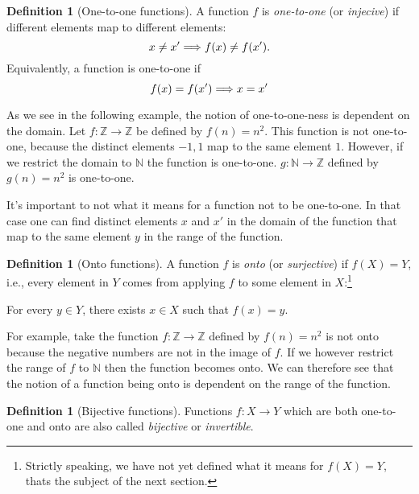 \documentclass[a4paper, twocolumn]{report}
\newcounter{dummy} \numberwithin{dummy}{section}
\theoremstyle{definition}
\newtheorem{defn}[dummy]{Definition}
\theoremstyle{solution}
\begin{document}
\begin{defn}[One-to-one functions]
  \label{defn_3314}
  A function $f$ is \textit{one-to-one} (or \textit{injecive}) if different elements map to different elements:
  \begin{equation}
    \notag
    x \neq x' \Longrightarrow f(x) \neq f(x').
  \end{equation}
  Equivalently, a function is one-to-one if
  \begin{equation}
    \notag
    f(x) = f(x') \Longrightarrow x = x'
  \end{equation}
\end{defn}
\addtocounter{dummy}{2}
As we see in the following example, the notion of one-to-one-ness is dependent
on the domain.  Let $f : \mathbb{Z} \rightarrow \mathbb{Z}$ be defined by $f(n)
= n^{2}$. This function is not one-to-one, because the distinct elements $-1,
1$ map to the same element $1$. However, if we restrict the domain to
$\mathbb{N}$ the function is one-to-one. $g : \mathbb{N} \rightarrow
\mathbb{Z}$ defined by $g(n) = n^{2}$ is one-to-one.

It's important to not what it means for a function not to be one-to-one. In
that case one can find distinct elements $x$ and $x'$ in the domain of the
function that map to the same element $y$ in the range of the function.

\begin{defn}[Onto functions]
  \label{defn_3317}
  A function $f$ is \textit{onto} (or \textit{surjective}) if $f(X) = Y$, i.e.,
  every element in $Y$ comes from applying $f$ to some element in
  $X$:\footnote{Strictly speaking, we have not yet defined what it means for
  $f(X) = Y$, thats the subject of the next section.}
  \begin{center}
    For every $y \in Y$, there exists $x \in X$ such that $f(x) = y$.
  \end{center}
\end{defn}
\addtocounter{dummy}{2}

For example, take the function $f : \mathbb{Z} \rightarrow \mathbb{Z}$ defined
by $f(n) = n^{2}$ is not onto because the negative numbers are not in the image
of $f$.  If we however restrict the range of $f$ to $\mathbb{N}$ then the
function becomes onto.  We can therefore see that the notion of a function
being onto is dependent on the range of the function.

\begin{defn}[Bijective functions]
  \label{defn_3320}
  Functions $f : X \rightarrow Y$ which are both one-to-one and onto are also
  called \textit{bijective} or \textit{invertible}.
\end{defn}
\end{document}

